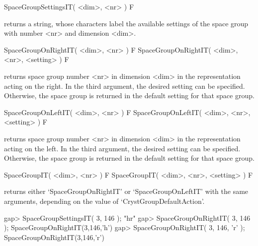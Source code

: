 \>SpaceGroupSettingsIT( <dim>, <nr> ) F

returns a string, whose characters label the available settings of
the space group with number <nr> and dimension <dim>.

\> SpaceGroupOnRightIT( <dim>, <nr> ) F
\> SpaceGroupOnRightIT( <dim>, <nr>, <setting> ) F

returns space group number <nr> in dimension <dim> in the
representation acting on the right. In the third argument,
the desired setting can be specified. Otherwise, the space 
group is returned in the default setting for that space group.

\> SpaceGroupOnLeftIT( <dim>, <nr> ) F
\> SpaceGroupOnLeftIT( <dim>, <nr>, <setting> ) F

returns space group number <nr> in dimension <dim> in the
representation acting on the left. In the third argument,
the desired setting can be specified. Otherwise, the space 
group is returned in the default setting for that space group.

\> SpaceGroupIT( <dim>, <nr> ) F
\> SpaceGroupIT( <dim>, <nr>, <setting> ) F

returns either `SpaceGroupOnRightIT' or `SpaceGroupOnLeftIT' with
the same arguments, depending on the value of `CrystGroupDefaultAction'.

\beginexample
gap> SpaceGroupSettingsIT( 3, 146 );
"hr"
gap> SpaceGroupOnRightIT( 3, 146 );        
SpaceGroupOnRightIT(3,146,'h')
gap> SpaceGroupOnRightIT( 3, 146, 'r' );
SpaceGroupOnRightIT(3,146,'r')
\endexample



